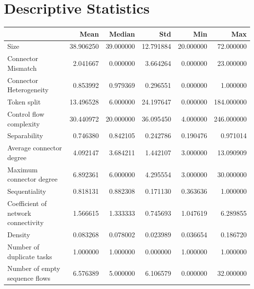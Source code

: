 \documentclass[a4paper]{article}
\begin{document}
\section*{Descriptive Statistics}
\begin{center}
\begin{tabular}{lrrrrr}
\toprule
 & Mean & Median & Std & Min & Max \\
\midrule
Size & 38.906250 & 39.000000 & 12.791884 & 20.000000 & 72.000000 \\
Connector Mismatch & 2.041667 & 0.000000 & 3.664264 & 0.000000 & 23.000000 \\
Connector Heterogeneity & 0.853992 & 0.979369 & 0.296551 & 0.000000 & 1.000000 \\
Token split & 13.496528 & 6.000000 & 24.197647 & 0.000000 & 184.000000 \\
Control flow complexity & 30.440972 & 20.000000 & 36.095450 & 4.000000 & 246.000000 \\
Separability & 0.746380 & 0.842105 & 0.242786 & 0.190476 & 0.971014 \\
Average connector degree & 4.092147 & 3.684211 & 1.442107 & 3.000000 & 13.090909 \\
Maximum connector degree & 6.892361 & 6.000000 & 4.295554 & 3.000000 & 30.000000 \\
Sequentiality & 0.818131 & 0.882308 & 0.171130 & 0.363636 & 1.000000 \\
Coefficient of network connectivity & 1.566615 & 1.333333 & 0.745693 & 1.047619 & 6.289855 \\
Density & 0.083268 & 0.078002 & 0.023989 & 0.036654 & 0.186720 \\
Number of duplicate tasks & 1.000000 & 1.000000 & 0.000000 & 1.000000 & 1.000000 \\
Number of empty sequence flows & 6.576389 & 5.000000 & 6.106579 & 0.000000 & 32.000000 \\
\bottomrule
\end{tabular}
\end{center}
\end{document}

